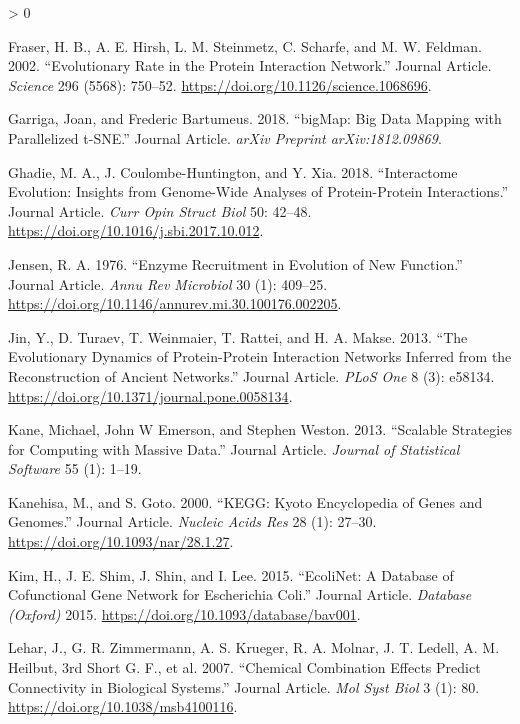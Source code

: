 \documentclass[
]{article}
\newlength{\cslhangindent}
\newenvironment{CSLReferences}[2] %
 {%
  \setlength{\parindent}{0pt}
  \ifodd #1 \everypar{\setlength{\hangindent}{\cslhangindent}}\ignorespaces\fi
  \ifnum #2 > 0
  \setlength{\parskip}{#2\baselineskip}
  \fi
 }%
 {}
\begin{document}
\begin{CSLReferences}{1}{0}
\leavevmode\hypertarget{ref-Fraser2002}{}%
Fraser, H. B., A. E. Hirsh, L. M. Steinmetz, C. Scharfe, and M. W. Feldman. 2002. {``Evolutionary Rate in the Protein Interaction Network.''} Journal Article. \emph{Science} 296 (5568): 750--52. \url{https://doi.org/10.1126/science.1068696}.

\leavevmode\hypertarget{ref-Garriga2018}{}%
Garriga, Joan, and Frederic Bartumeus. 2018. {``bigMap: Big Data Mapping with Parallelized t-SNE.''} Journal Article. \emph{arXiv Preprint arXiv:1812.09869}.

\leavevmode\hypertarget{ref-Ghadie2018}{}%
Ghadie, M. A., J. Coulombe-Huntington, and Y. Xia. 2018. {``Interactome Evolution: Insights from Genome-Wide Analyses of Protein-Protein Interactions.''} Journal Article. \emph{Curr Opin Struct Biol} 50: 42--48. \url{https://doi.org/10.1016/j.sbi.2017.10.012}.

\leavevmode\hypertarget{ref-Jensen1976}{}%
Jensen, R. A. 1976. {``Enzyme Recruitment in Evolution of New Function.''} Journal Article. \emph{Annu Rev Microbiol} 30 (1): 409--25. \url{https://doi.org/10.1146/annurev.mi.30.100176.002205}.

\leavevmode\hypertarget{ref-Jin2013}{}%
Jin, Y., D. Turaev, T. Weinmaier, T. Rattei, and H. A. Makse. 2013. {``The Evolutionary Dynamics of Protein-Protein Interaction Networks Inferred from the Reconstruction of Ancient Networks.''} Journal Article. \emph{PLoS One} 8 (3): e58134. \url{https://doi.org/10.1371/journal.pone.0058134}.

\leavevmode\hypertarget{ref-Kane2013}{}%
Kane, Michael, John W Emerson, and Stephen Weston. 2013. {``Scalable Strategies for Computing with Massive Data.''} Journal Article. \emph{Journal of Statistical Software} 55 (1): 1--19.

\leavevmode\hypertarget{ref-Kanehisa2000}{}%
Kanehisa, M., and S. Goto. 2000. {``KEGG: Kyoto Encyclopedia of Genes and Genomes.''} Journal Article. \emph{Nucleic Acids Res} 28 (1): 27--30. \url{https://doi.org/10.1093/nar/28.1.27}.

\leavevmode\hypertarget{ref-Kim2015}{}%
Kim, H., J. E. Shim, J. Shin, and I. Lee. 2015. {``EcoliNet: A Database of Cofunctional Gene Network for Escherichia Coli.''} Journal Article. \emph{Database (Oxford)} 2015. \url{https://doi.org/10.1093/database/bav001}.

\leavevmode\hypertarget{ref-Lehar2007}{}%
Lehar, J., G. R. Zimmermann, A. S. Krueger, R. A. Molnar, J. T. Ledell, A. M. Heilbut, 3rd Short G. F., et al. 2007. {``Chemical Combination Effects Predict Connectivity in Biological Systems.''} Journal Article. \emph{Mol Syst Biol} 3 (1): 80. \url{https://doi.org/10.1038/msb4100116}.


\end{CSLReferences}
\end{document}
